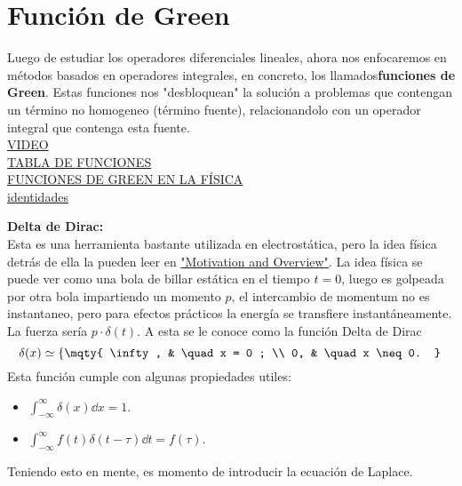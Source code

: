 \section*{Función de Green}
Luego de estudiar los operadores diferenciales lineales, ahora nos enfocaremos en métodos basados en operadores integrales, en concreto, los llamados\textbf{funciones de Green}. Estas funciones nos "desbloquean" la solución a problemas que contengan un término no homogeneo (término fuente), relacionandolo con un operador integral que contenga esta fuente. \\


\href{https://youtu.be/ism2SfZgFJg?si=Mi-57CoReH2CGW91}{VIDEO} \\
\href{https://en.wikipedia.org/wiki/Green\%27s_function#Table_of_Green's_functions}{TABLA DE FUNCIONES} \\
\href{https://brilliant.org/wiki/greens-functions-in-physics/}{FUNCIONES DE GREEN EN LA FÍSICA} \\
\href{https://es.wikipedia.org/wiki/Identidades_de_Green}{identidades}
\begin{mdframed}[style=warning]
	{\Large \textbf{Delta de Dirac:}} \\
	Esta es una herramienta bastante utilizada en electrostática, pero la idea física detrás de ella la pueden leer en \href{https://en.wikipedia.org/wiki/Dirac_delta_function#Motivation_and_overview}{"Motivation and Overview"}. La idea física se puede ver como una bola de billar estática en el tiempo $t = 0$, luego es golpeada por otra bola impartiendo un momento $p$, el intercambio de momentum no es instantaneo, pero para efectos prácticos la energía se transfiere instantáneamente. La fuerza sería $p\cdot \delta (t)$. A esta se le conoce como la función Delta de Dirac
		$$ \delta (x) \simeq \left\{ \mqty{ \infty , & \quad x = 0 ; \\ 0, & \quad x \neq 0. } \right. $$
	Esta función cumple con algunas propiedades utiles:
	\begin{itemize}
		\item $\int _{-\infty} ^\infty \delta (x) \dd{x} = 1.$
		\item $ \int _{-\infty} ^\infty f(t) \delta (t - \tau) \dd{t} = f(\tau). $
	\end{itemize}
\end{mdframed}




Teniendo esto en mente, es momento de introducir la ecuación de Laplace.




